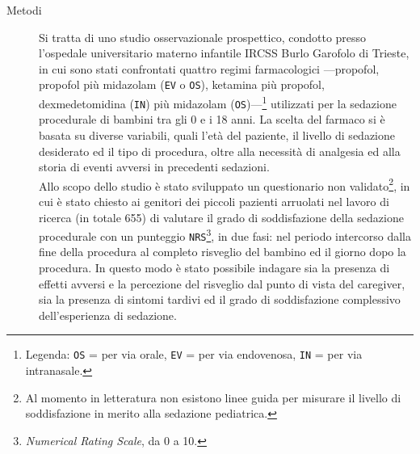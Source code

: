 \begin{description}
\item[Metodi] 

Si tratta di uno studio osservazionale prospettico, condotto presso l'ospedale universitario materno infantile IRCSS Burlo Garofolo di Trieste, in cui sono stati confrontati quattro regimi farmacologici ---propofol, propofol più midazolam (\texttt{EV} o \texttt{OS}), ketamina più propofol, dexmedetomidina (\texttt{IN}) più midazolam (\texttt{OS})---\footnote{Legenda: \texttt{OS} = per via orale, \texttt{EV} = per via endovenosa, \texttt{IN} = per via intranasale.} utilizzati per la sedazione procedurale di bambini tra gli 0 e i 18 anni. La scelta del farmaco si è basata su diverse variabili, quali l'età del paziente, il livello di sedazione desiderato ed il tipo di procedura, oltre alla necessità di analgesia ed alla storia di eventi avversi in precedenti sedazioni. 
\\Allo scopo dello studio è stato sviluppato un questionario non validato\footnote{Al momento in letteratura non esistono linee guida per misurare il livello di soddisfazione in merito alla sedazione pediatrica.}, in cui è stato chiesto ai genitori dei piccoli pazienti arruolati nel lavoro di ricerca (in totale 655) di valutare il grado di soddisfazione della sedazione procedurale con un punteggio \texttt{NRS}\footnote{\emph{Numerical Rating Scale}, da 0 a 10.}, in due fasi: nel periodo intercorso dalla fine della procedura al completo risveglio del bambino ed il giorno dopo la procedura. In questo modo è stato possibile indagare sia la presenza di effetti avversi e la percezione del risveglio dal punto di vista del caregiver, sia la presenza di sintomi tardivi ed il grado di soddisfazione complessivo dell'esperienza di sedazione.


\end{description}
